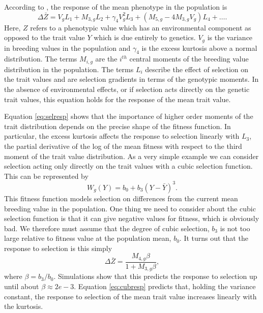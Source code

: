 \documentclass{article}
\begin{document}
According to \citet{Turelli1990}, the response of the mean phenotype in the
population is 
\begin{equation}
  \label{eq:selresp}
  \Delta \bar{Z} = V_gL_1 + M_{3,g}L_2 + \gamma_4V^2_gL_3 +
  \left( M_{5,g}-4M_{3,g}V_g\right)L_4 + \ldots.
\end{equation}
Here, $Z$ refers to a phenotypic value which has an environmental component as
opposed to the trait value $Y$ which is due entirely to genetics. $V_g$ is the
variance in breeding values in the population and $\gamma_4$ is the excess
kurtosis above a normal distribution. The terms $M_{i,g}$ are the $i^{th}$
central moments of the breeding value distribution in the population. The terms
$L_i$ describe the effect of selection on the trait values and are selection
gradients in terms of the genotypic moments. In the absence of environmental
effects, or if selection acts directly on the genetic trait values, this
equation holds for the response of the mean trait value.

Equation \eqref{eq:selresp} shows that the importance of higher order moments of
the trait distribution depends on the precise shape of the fitness function. In
particular, the excess kurtosis affects the response to selection linearly with
$L_3$, the partial derivative of the log of the mean fitness with respect to the
third moment of the trait value distribution. As a very simple example we can
consider selection acting only directly on the trait values with a cubic
selection function. This can be represented by
\begin{equation}
  \label{eq:cubsel}
  W_g(Y) = b_0 + b_3(Y-\bar{Y})^3.
\end{equation}
This fitness function models selection on differences from the current mean
breeding value in the population. One thing we need to consider about the cubic
selection function is that it can give negative values for fitness, which is
obviously bad. We therefore must assume that the degree of cubic selection,
$b_3$ is not too large relative to fitness value at the population mean, $b_0$.
It turns out that the response to selection is this simply
\begin{equation}
  \label{eq:cubresp}
  \Delta \bar{Z} = \frac{M_{4,g}\beta}{1 + M_{3,g}\beta},
\end{equation}
where $\beta=b_3/b_0$. Simulations show that this predicts the response to
selection up until about $\beta\approx 2e-3$. Equation \eqref{eq:cubresp}
predicts that, holding the variance constant, the response to selection of the
mean trait value increases linearly with the kurtosis.
\end{document}

